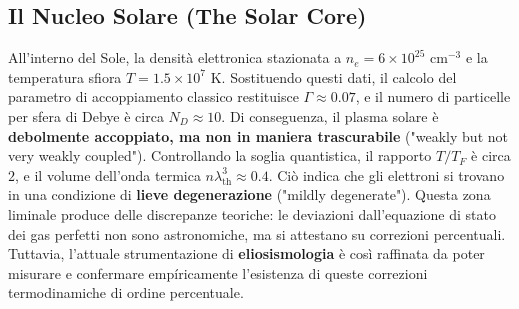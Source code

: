 \subsection{Il Nucleo Solare (The Solar Core)}
All'interno del Sole, la densità elettronica stazionata a $n_e = 6 \times 10^{25} \text{ cm}^{-3}$ e la temperatura sfiora $T = 1.5 \times 10^7 \text{ K}$.
Sostituendo questi dati, il calcolo del parametro di accoppiamento classico restituisce $\Gamma \approx 0.07$, e il numero di particelle per sfera di Debye è circa $N_D \approx 10$. Di conseguenza, il plasma solare è \textbf{debolmente accoppiato, ma non in maniera trascurabile} ("weakly but not very weakly coupled").
Controllando la soglia quantistica, il rapporto $T/T_F$ è circa $2$, e il volume dell'onda termica $n\lambda_{\text{th}}^3 \approx 0.4$. Ciò indica che gli elettroni si trovano in una condizione di \textbf{lieve degenerazione} ("mildly degenerate"). Questa zona liminale produce delle discrepanze teoriche: le deviazioni dall'equazione di stato dei gas perfetti non sono astronomiche, ma si attestano su correzioni percentuali. Tuttavia, l'attuale strumentazione di \textbf{eliosismologia} è così raffinata da poter misurare e confermare empíricamente l'esistenza di queste correzioni termodinamiche di ordine percentuale.

